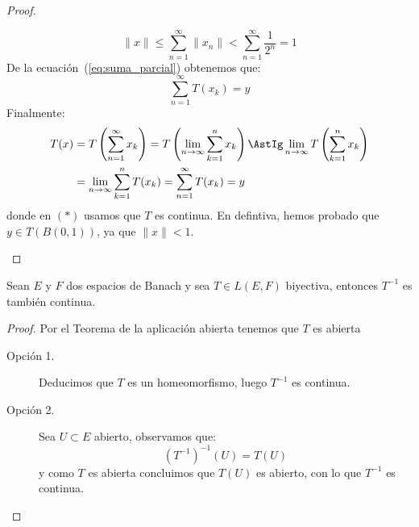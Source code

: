 \begin{teo}
\begin{proof}
\begin{description}
                \begin{equation*}
                    \|x\| \leq \sum_{n=1}^{\infty}\|x_n\| < \sum_{n=1}^{\infty}\frac{1}{2^n} =1
                \end{equation*}
                De la ecuación~(\ref{eq:suma_parcial}) obtenemos que:
                \begin{equation*}
                    \sum_{n=1}^{\infty}T(x_k) = y
                \end{equation*}
                Finalmente:
                \begin{align*}
                    T(x) &= T\left(\sum_{n=1}^{\infty}x_k\right) = T\left(\lim_{n\to\infty}\sum_{k=1}^{n}x_k\right) \AstIg \lim_{n\to\infty}T\left(\sum_{k=1}^{n}x_k\right) \\ &= \lim_{n\to\infty}\sum_{k=1}^{n}T(x_k) = \sum_{n=1}^{\infty}T(x_k)  = y
                \end{align*}
                donde en $(\ast)$ usamos que $T$ es continua. En defintiva, hemos probado que $y\in T(B(0,1))$, ya que $\|x\| < 1$.
        \end{description}
    \end{proof}
\end{teo}


\begin{coro}
    Sean $E$ y $F$ dos espacios de Banach y sea $T\in L(E,F)$ biyectiva, entonces $T^{-1}$ es también continua.
    \begin{proof}
        Por el Teorema de la aplicación abierta tenemos que $T$ es abierta
        \begin{description}
            \item [Opción 1.] Deducimos que $T$ es un homeomorfismo, luego $T^{-1}$ es continua.
            \item [Opción 2.] Sea $U\subset E$ abierto, observamos que:
                \begin{equation*}
                    {(T^{-1})}^{-1}(U) = T(U)
                \end{equation*}
                y como $T$ es abierta concluimos que $T(U)$ es abierto, con lo que $T^{-1}$ es continua.
        \end{description}
    \end{proof}
\end{coro}

